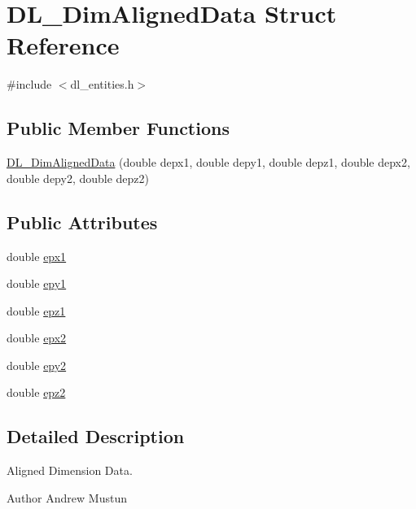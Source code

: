 \hypertarget{structDL__DimAlignedData}{\section{D\-L\-\_\-\-Dim\-Aligned\-Data Struct Reference}
\label{structDL__DimAlignedData}
}


{\ttfamily \#include $<$dl\-\_\-entities.\-h$>$}

\subsection*{Public Member Functions}
\begin{DoxyCompactItemize}
\item 
\hyperlink{structDL__DimAlignedData_a53fb8cb2b4af9d7314bb3d0aa9115cd3}{D\-L\-\_\-\-Dim\-Aligned\-Data} (double depx1, double depy1, double depz1, double depx2, double depy2, double depz2)
\end{DoxyCompactItemize}
\subsection*{Public Attributes}
\begin{DoxyCompactItemize}
\item 
double \hyperlink{structDL__DimAlignedData_a2dea72d8fbed1d708fb5e2e66c71146e}{epx1}
\item 
double \hyperlink{structDL__DimAlignedData_abe35b1951b67d9092ce237aa53cfc1cb}{epy1}
\item 
double \hyperlink{structDL__DimAlignedData_a37f500423bccdcecb6fff65fba9e7795}{epz1}
\item 
double \hyperlink{structDL__DimAlignedData_a3fe88cc0c10a0b74d4c05d686ea0b40f}{epx2}
\item 
double \hyperlink{structDL__DimAlignedData_a61d3ab3a20ed5df8d21c471ba5aab180}{epy2}
\item 
double \hyperlink{structDL__DimAlignedData_a8a9851d99e312e91e64cd57337b79e63}{epz2}
\end{DoxyCompactItemize}


\subsection{Detailed Description}
Aligned Dimension Data.

\begin{DoxyAuthor}{Author}
Andrew Mustun 
\end{DoxyAuthor}


